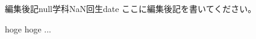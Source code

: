 \documentclass[10pt,b5paper,papersize,dvipdfmx]{jsbook}
\begin{document}
\begin{preface}{編集後記}{null学科NaN回生}{}{date}
  ここに編集後記を書いてください。\par
  hoge hoge ...
\end{preface}
\end{document}
